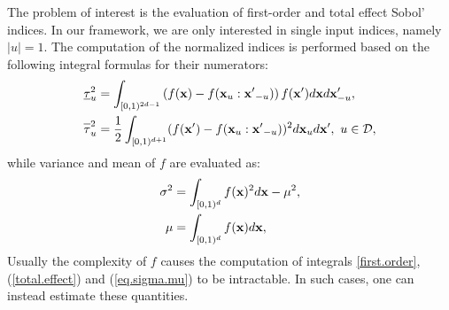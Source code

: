 The problem of interest is the evaluation of first-order and total effect Sobol' indices. In our framework, we are only interested in single input indices, namely $|u|=1$. The computation of the normalized indices is performed based on the following integral formulas for their numerators:
\begin{align}
\label{first.order}
\underline{\tau}_u^2  &= \int_{[0,1)^{2d-1}} \left(f(\vx)-
f(\vx_u:{\vx'}_{-u})\right)f(\vx')d\vx d{\vx'_{-u}}, \\
\label{total.effect}
\ov{$\tau$}_u^2 &= \frac{1}{2}\int_{[0,1)^{d+1}}(f(\vx')-f(\vx_u:{\vx'}_{-u}))^2 d\vx_u d{\vx'}, \ u \in \mathcal{D},
\end{align}
while variance and mean of $f$ are evaluated as:
\begin{gather}
\begin{aligned}
\sigma^2 &= \int_{[0,1)^{d}} f(\boldsymbol{\mathbf{x}})^2d{\boldsymbol{\mathbf{x}}} - \mu^2, \\
 \mu &= \int_{[0,1)^{d}} f(\boldsymbol{\mathbf{x}}) d{\boldsymbol{\mathbf{x}}},
\label{eq.sigma.mu}
\end{aligned}
\end{gather}
Usually the complexity of $f$ causes the computation of integrals \eqref{first.order}, (\ref{total.effect}) and (\ref{eq.sigma.mu}) to be intractable. In such cases, one can instead estimate these quantities.

